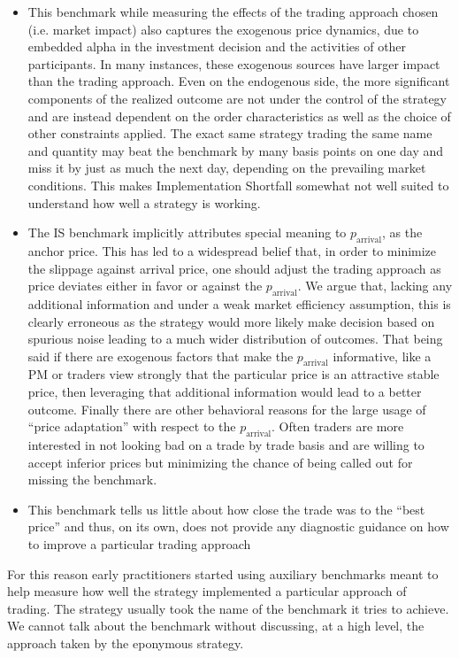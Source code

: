 \begin{itemize}
\item This benchmark while measuring the effects of the trading approach chosen (i.e. market impact) also captures the exogenous price dynamics, due to embedded alpha in the investment decision and the activities of other participants. In many instances, these exogenous sources have larger impact than the trading approach. Even on the endogenous side, the more significant components of the realized outcome are not under the control of the strategy and are instead dependent on the order characteristics as well as the choice of other constraints applied. The exact same strategy trading the same name and quantity may beat the benchmark by many basis points on one day and miss it by just as much the next day, depending on the prevailing market conditions. This makes Implementation Shortfall somewhat not well suited to understand how well a strategy is working.

\item The IS benchmark implicitly attributes special meaning to $p_{\text{arrival}}$, as the anchor price. This has led to a widespread belief that, in order to minimize the slippage against arrival price, one should adjust the trading approach as price deviates either in favor or against the $p_{\text{arrival}}$. We argue that, lacking any additional information and under a weak market efficiency assumption, this is clearly erroneous as the strategy would more likely make decision based on spurious noise leading to a much wider distribution of outcomes. That being said if there are exogenous factors that make the $p_{\text{arrival}}$ informative, like a PM or traders view strongly that the particular price is an attractive stable price, then leveraging that additional information would lead to a better outcome. Finally there are other behavioral reasons for the large usage of ``price adaptation'' with respect to the $p_{\text{arrival}}$. Often traders are more interested in not looking bad on a trade by trade basis and are willing to accept inferior prices but minimizing the chance of being called out for missing the benchmark.

\item This benchmark tells us little about how close the trade was to the ``best price'' and thus, on its own, does not provide any diagnostic guidance on how to improve a particular trading approach
\end{itemize}


For this reason early practitioners started using auxiliary benchmarks meant to help measure how well the strategy implemented a particular approach of trading. The strategy usually took the name of the benchmark it tries to achieve. We cannot talk about the benchmark without discussing, at a high level, the approach taken by the  eponymous strategy.


